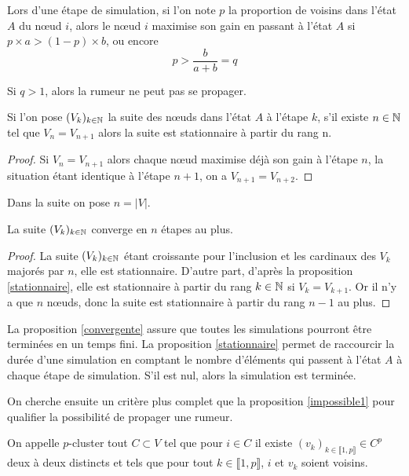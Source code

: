 \documentclass{article}
\begin{document}
Lors d'une étape de simulation, si l'on note $p$ la proportion de voisins dans l'état $A$ du nœud $i$, alors le nœud $i$ maximise son gain en passant à l'état $A$ si $p \times a > (1-p) \times b$, ou encore $$ p > \frac{b}{a+b} = q$$ 

\begin{prop}
  \label{impossible1}
  Si $q > 1$, alors la rumeur ne peut pas se propager.
\end{prop}

\begin{prop}
  \label{stationnaire}
  Si l'on pose $(V_k)_{k\in\mathbb{N}}$ la suite des nœuds dans l'état $A$ à l'étape $k$, s'il existe $n\in\mathbb{N}$ tel que $V_n = V_{n+1}$ alors la suite est stationnaire à partir du rang n.
\end{prop}
\begin{proof}
  Si $V_n = V_{n+1}$ alors chaque nœud maximise déjà son gain à l'étape $n$, la situation étant identique à l'étape $n+1$, on a $V_{n+1} = V_{n+2}$.
\end{proof}

Dans la suite on pose $n=|V|$.

\begin{prop}
  \label{convergente}
  La suite $(V_k)_{k\in\mathbb{N}}$ converge en $n$ étapes au plus.
\end{prop}
\begin{proof}
  La suite $(V_k)_{k\in\mathbb{N}}$ étant croissante pour l'inclusion et les cardinaux des $V_k$ majorés par $n$, elle est stationnaire. D'autre part, d'après la proposition \ref{stationnaire}, elle est stationnaire à partir du rang $k\in\mathbb{N}$ si $V_k = V_{k+1}$. Or il n'y a que $n$ nœuds, donc la suite est stationnaire à partir du rang $n-1$ au plus. 
\end{proof}

La proposition \ref{convergente} assure que toutes les simulations pourront être terminées en un temps fini. La proposition \ref{stationnaire} permet de raccourcir la durée d'une simulation en comptant le nombre d'éléments qui passent à l'état $A$ à chaque étape de simulation. S'il est nul, alors la simulation est terminée.

On cherche ensuite un critère plus complet que la proposition \ref{impossible1} pour qualifier la possibilité de propager une rumeur.
\begin{defi}
  On appelle $p$-cluster tout $C \subset V$ tel que pour $i\in C$ il existe $(v_k)_{k\in \llbracket1,p\rrbracket} \in C^p$ deux à deux distincts et tels que pour tout $k\in \llbracket1,p\rrbracket$, $i$ et $v_k$ soient voisins.
\end{defi}
\end{document}
